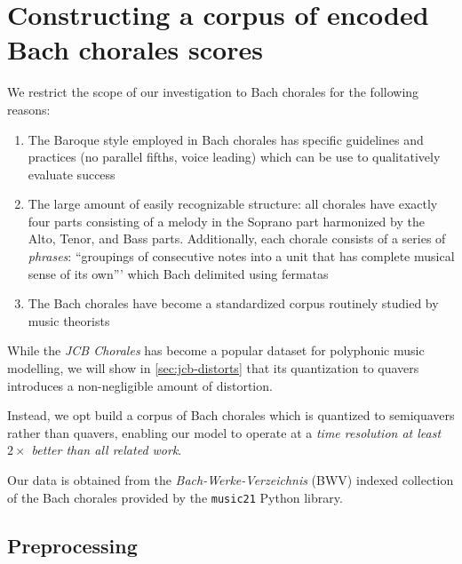 \section{Constructing a corpus of encoded Bach chorales scores}


We restrict the scope of our investigation to Bach chorales for the following reasons:
\begin{enumerate}
  \item The Baroque style employed in Bach chorales has specific guidelines and
    practices \citep{piston1978harmony} (\eg no parallel fifths, voice leading)
    which can be use to qualitatively evaluate success
  \item The large amount of easily recognizable structure: all chorales have
    exactly four parts consisting of a melody in the Soprano part harmonized by
    the Alto, Tenor, and Bass parts. Additionally, each chorale consists of a
    series of \emph{phrases}: ``groupings of consecutive notes into a unit that
    has complete musical sense of its own'''\citep{nattiez1990music} which Bach
    delimited using fermatas
  \item The Bach chorales have become a standardized corpus routinely studied
    by music theorists\citep{white2002guidelines}
\end{enumerate}

While the \textit{JCB Chorales} \citep{Allan2005} has become a popular dataset
for polyphonic music modelling, we will show in \ref{sec:jcb-distorts} that its quantization to quavers
introduces a non-negligible amount of distortion.

Instead, we opt build a corpus of Bach chorales which is quantized to
semiquavers rather than quavers, enabling our model to operate at a \emph{time
resolution at least $2\times$ better than all related work}.

Our data is obtained from the \emph{Bach-Werke-Verzeichnis} (BWV)
\citep{butt1999bach} indexed collection of the Bach chorales provided by the
\texttt{music21}\citep{Scott2015} Python library.

\subsection{Preprocessing}\label{sec:preprocessing}


